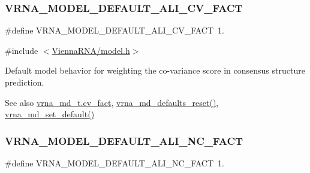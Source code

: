 \subsubsection{\texorpdfstring{V\+R\+N\+A\+\_\+\+M\+O\+D\+E\+L\+\_\+\+D\+E\+F\+A\+U\+L\+T\+\_\+\+A\+L\+I\+\_\+\+C\+V\+\_\+\+F\+A\+CT}{VRNA\_MODEL\_DEFAULT\_ALI\_CV\_FACT}}
{\footnotesize\ttfamily \#define V\+R\+N\+A\+\_\+\+M\+O\+D\+E\+L\+\_\+\+D\+E\+F\+A\+U\+L\+T\+\_\+\+A\+L\+I\+\_\+\+C\+V\+\_\+\+F\+A\+CT~1.}



{\ttfamily \#include $<$\mbox{\hyperlink{model_8h}{Vienna\+R\+N\+A/model.\+h}}$>$}



Default model behavior for weighting the co-\/variance score in consensus structure prediction. 

\begin{DoxySeeAlso}{See also}
\mbox{\hyperlink{group__model__details_a62ebefb9d0643e5c4c8a2ec84a105ce6}{vrna\+\_\+md\+\_\+t.\+cv\+\_\+fact}}, \mbox{\hyperlink{group__model__details_ga70834424cf804d149937de89f80ceb45}{vrna\+\_\+md\+\_\+defaults\+\_\+reset()}}, \mbox{\hyperlink{group__model__details_ga8ac6ff84936282436f822644bf841f66}{vrna\+\_\+md\+\_\+set\+\_\+default()}} 
\end{DoxySeeAlso}
\mbox{\label{group__model__details_ga8f774daaafec28160c1ca5d09f2cbdba}} 
\subsubsection{\texorpdfstring{V\+R\+N\+A\+\_\+\+M\+O\+D\+E\+L\+\_\+\+D\+E\+F\+A\+U\+L\+T\+\_\+\+A\+L\+I\+\_\+\+N\+C\+\_\+\+F\+A\+CT}{VRNA\_MODEL\_DEFAULT\_ALI\_NC\_FACT}}
{\footnotesize\ttfamily \#define V\+R\+N\+A\+\_\+\+M\+O\+D\+E\+L\+\_\+\+D\+E\+F\+A\+U\+L\+T\+\_\+\+A\+L\+I\+\_\+\+N\+C\+\_\+\+F\+A\+CT~1.}



